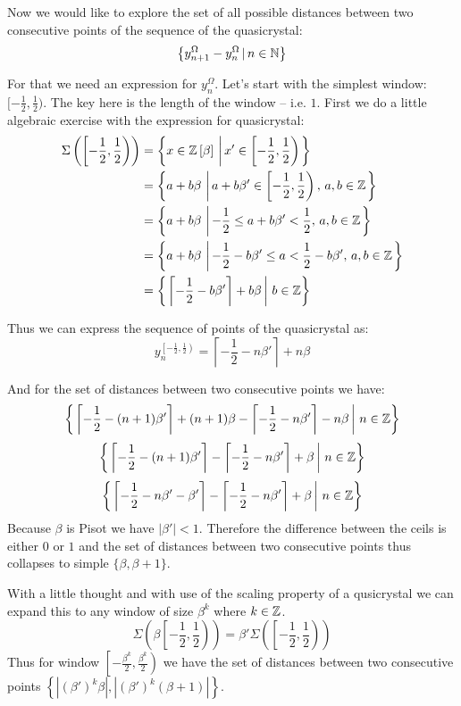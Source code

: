 \documentclass[text.tex]{subfiles}
\begin{document}
Now we would like to explore the set of all possible distances between two consecutive points of the sequence of the quasicrystal: 
$$\left\{ y^\Omega_{n+1}-y^\Omega_{n}\,|\, n\in\mathbb{N} \right\}$$

For that we need an expression for $y^\Omega_n$. Let's start with the simplest window: $[-\frac{1}{2}, \frac{1}{2})$. The key here is the length of the window -- i.e. $1$. First we do a little algebraic exercise with the expression for quasicrystal:
\begin{align*}
\Sigma\left(\left[-\frac{1}{2}, \frac{1}{2}\right)\right) &= \left\{x\in\mathbb{Z}\left[\beta\right]\,\left|\, x'\in \left[-\frac{1}{2}, \frac{1}{2}\right)\right.\right\}\\
  &= \left\{a+b\beta\,\left|\, a+b\beta'\in \left[-\frac{1}{2}, \frac{1}{2}\right),\,a,b\in\mathbb{Z}\right.\right\}\\
  &= \left\{a+b\beta\,\left|\, -\frac{1}{2}\leq a+b\beta'<\frac{1}{2},\,a,b\in\mathbb{Z}\right.\right\}\\
  &= \left\{a+b\beta\,\left|\, -\frac{1}{2}-b\beta'\leq a < \frac{1}{2}-b\beta',\,a,b\in\mathbb{Z}\right.\right\}\\
  &= \left\{\left.\left\lceil-\frac{1}{2} -b\beta'\right\rceil + b\beta\,\right|\, b\in\mathbb{Z}\right\}\\
\end{align*}

Thus we can express the sequence of points of the quasicrystal as:
$$y^{\left[-\frac{1}{2}, \frac{1}{2}\right)}_n = \left\lceil-\frac{1}{2} -n\beta'\right\rceil + n\beta$$

And for the set of distances between two consecutive points we have:
$$\left\{ \left.\left\lceil-\frac{1}{2} -(n+1)\beta'\right\rceil + (n+1)\beta - \left\lceil-\frac{1}{2} -n\beta'\right\rceil - n\beta \,\right|\, n\in\mathbb{Z}\right\}$$
$$\left\{ \left.\left\lceil-\frac{1}{2} -(n+1)\beta'\right\rceil - \left\lceil-\frac{1}{2} -n\beta'\right\rceil + \beta \,\right|\, n\in\mathbb{Z}\right\}$$
$$\left\{ \left.\left\lceil-\frac{1}{2} -n\beta' - \beta'\right\rceil - \left\lceil-\frac{1}{2} -n\beta'\right\rceil + \beta \,\right|\, n\in\mathbb{Z}\right\}$$
Because $\beta$ is Pisot we have $|\beta'|<1$. Therefore the difference between the ceils is either $0$ or $1$ and the set of distances between two consecutive points thus collapses to simple $\{\beta, \beta + 1\}$. 

With a little thought and with use of the scaling property of a qusicrystal we can expand this to any window of size $\beta^k$ where $k\in\mathbb{Z}$. 
$$\Sigma\left(\beta\left[-\frac{1}{2}, \frac{1}{2}\right)\right) = \beta'\Sigma\left(\left[-\frac{1}{2}, \frac{1}{2}\right)\right)$$
Thus for window $\left[-\frac{\beta^k}{2}, \frac{\beta^k}{2}\right)$ we have the set of distances between two consecutive points $\left\{\left|(\beta')^k\beta\right|, \left|(\beta')^k(\beta + 1)\right|\right\}$. 
\end{document}
